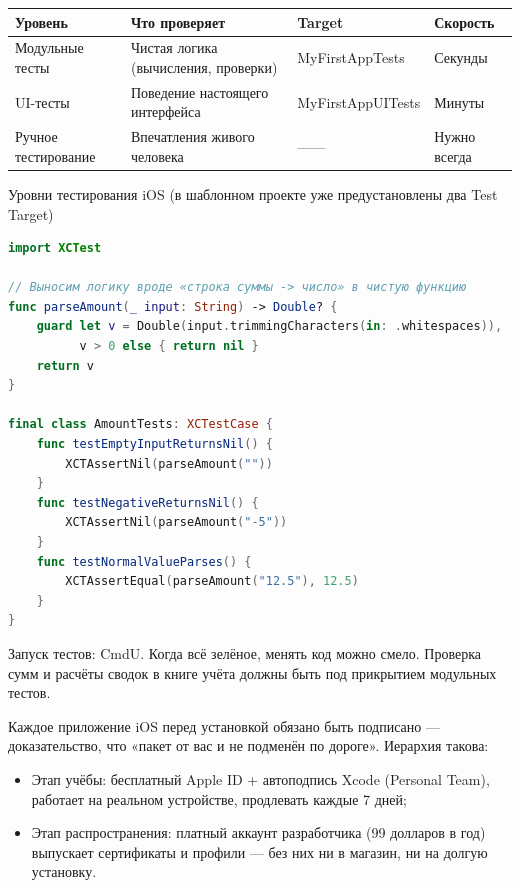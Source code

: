 \begin{center}
\begin{tabularx}{\linewidth}{|X|X|X|X|}
\hline
\textbf{Уровень} & \textbf{Что проверяет} & \textbf{Target} & \textbf{Скорость} \tabularnewline
\hline
Модульные тесты & Чистая логика (вычисления, проверки) & MyFirstAppTests & Секунды \tabularnewline
UI-тесты & Поведение настоящего интерфейса & MyFirstAppUITests & Минуты \tabularnewline
Ручное тестирование & Впечатления живого человека & —— & Нужно всегда \tabularnewline
\hline
\end{tabularx}
\end{center}

\begin{center}\small\color{gray}Уровни тестирования iOS (в шаблонном проекте уже предустановлены два Test Target)\end{center}

\begin{lstlisting}[language=Swift]
import XCTest

// Выносим логику вроде «строка суммы -> число» в чистую функцию
func parseAmount(_ input: String) -> Double? {
    guard let v = Double(input.trimmingCharacters(in: .whitespaces)),
          v > 0 else { return nil }
    return v
}

final class AmountTests: XCTestCase {
    func testEmptyInputReturnsNil() {
        XCTAssertNil(parseAmount(""))
    }
    func testNegativeReturnsNil() {
        XCTAssertNil(parseAmount("-5"))
    }
    func testNormalValueParses() {
        XCTAssertEqual(parseAmount("12.5"), 12.5)
    }
}
\end{lstlisting}

Запуск тестов: CmdU. Когда всё зелёное, менять код можно смело. Проверка сумм и расчёты сводок в книге учёта должны быть под прикрытием модульных тестов.


Каждое приложение iOS перед установкой обязано быть подписано — доказательство, что «пакет от вас и не подменён по дороге». Иерархия такова:

\begin{itemize}
  \item Этап учёбы: бесплатный Apple ID + автоподпись Xcode (Personal Team), работает на реальном устройстве, продлевать каждые 7 дней;
  \item Этап распространения: платный аккаунт разработчика (99 долларов в год) выпускает сертификаты и профили — без них ни в магазин, ни на долгую установку.
\end{itemize}

